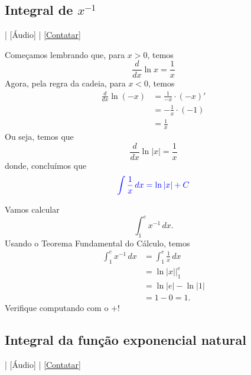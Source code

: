 \subsection{Integral de $x^{-1}$}

\begin{flushright}
  [Vídeo] | [Áudio] | \href{https://phkonzen.github.io/notas/contato.html}{[Contatar]}
\end{flushright}

Começamos lembrando que, para $x>0$, temos
\begin{equation}
  \frac{d}{dx}\ln x = \frac{1}{x}
\end{equation}
Agora, pela regra da cadeia, para $x<0$, temos
\begin{align}
  \frac{d}{dx}\ln(-x) &= \frac{1}{-x}\cdot (-x)'\\
                      &= -\frac{1}{x}\cdot (-1)\\
                      &= \frac{1}{x}
\end{align}
Ou seja, temos que
\begin{equation}
  \frac{d}{dx}\ln|x| = \frac{1}{x}
\end{equation}
donde, concluímos que
\begin{equation}
  {\color{blue}\int\frac{1}{x}\,dx = \ln|x| + C}
\end{equation}

\begin{ex}
  Vamos calcular
  \begin{equation}
    \int_1^e x^{-1}\,dx.
  \end{equation}
  Usando o Teorema Fundamental do Cálculo, temos
  \begin{align}
    \int_1^e x^{-1}\,dx &= \int_1^e \frac{1}{x}\,dx\\
                        &= \left. \ln|x|\right|_1^e \\
                             &= \ln|e| - \ln|1| \\
                             &= 1 - 0 = 1.
  \end{align}
  \ifispython
  Verifique computando com o {\python}+{\sympy}!
  \fi
\end{ex}

\subsection{Integral da função exponencial natural}\label{cap_int_subsec_funexp}

\begin{flushright}
  [Vídeo] | [Áudio] | \href{https://phkonzen.github.io/notas/contato.html}{[Contatar]}
\end{flushright}

